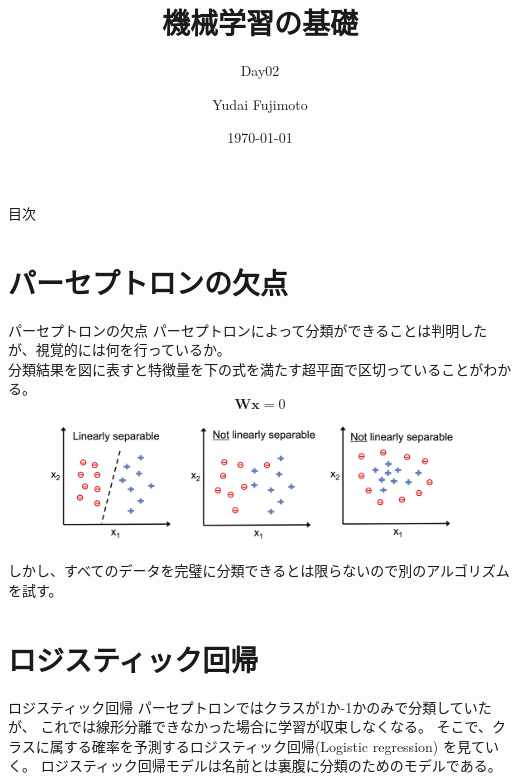 \documentclass[aspectratio=169, dvipdfmx, 11pt]{beamer} %
\title[Day02]{機械学習の基礎}
\subtitle{Day02}
\author[Yudai Fujimoto]{Yudai Fujimoto}
\institute[SUS]{Suwa University of Science}
\date{\today}
\begin{document}
\maketitle

\begin{frame}{目次}
    \tableofcontents
\end{frame}

\section{パーセプトロンの欠点}
\begin{frame}{パーセプトロンの欠点}
    パーセプトロンによって分類ができることは判明したが、視覚的には何を行っているか。 \\
    分類結果を図に表すと特徴量を下の式を満たす超平面で区切っていることがわかる。 \\
    \begin{equation*}
        \bm{W} \bm{x} = 0
    \end{equation*}
    \begin{figure}[b]
        \begin{center}
        \includegraphics[width=120mm]{img/day02/fig01.png}
        \end{center}
    \end{figure}
    しかし、すべてのデータを完璧に分類できるとは限らないので別のアルゴリズムを試す。
\end{frame}

\section{ロジスティック回帰}
\begin{frame}{ロジスティック回帰}
    パーセプトロンではクラスが1か-1かのみで分類していたが、
    これでは線形分離できなかった場合に学習が収束しなくなる。
    そこで、クラスに属する確率を予測するロジスティック回帰(Logistic regression)
    を見ていく。
    ロジスティック回帰モデルは名前とは裏腹に分類のためのモデルである。
\end{frame} 
\end{document}
